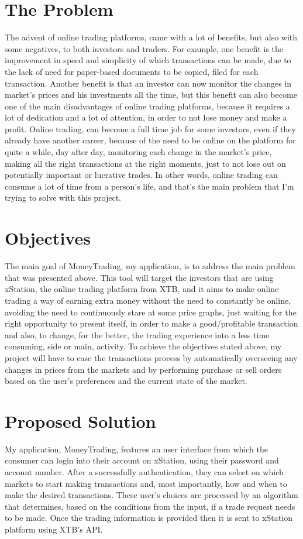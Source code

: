 \documentclass[12pt,a4paper]{report}
\begin{document}
\section{The Problem} 
The advent of online trading platforms, came with a lot of benefits, but also with some negatives, to both investors and traders. For example, one benefit is the improvement in speed and simplicity of which transactions can be made, due to the lack of need for paper-based documents to be copied, filed for each transaction. Another benefit is that an investor can now monitor the changes in market's prices and his investments all the time, but this benefit can also become one of the main disadvantages of online trading platforms, because it requires a lot of dedication and a lot of attention, in order to not lose money and make a profit. Online trading, can become a full time job for some investors, even if they already have another career, because of the need to be online on the platform for quite a while, day after day, monitoring each change in the market's price, making all the right transactions at the right moments, just to not lose out on potentially important or lucrative trades. In other words, online trading can consume a lot of time from a person's life, and that's the main problem that I'm trying to solve with this project.        
\section{Objectives}
The main goal of MoneyTrading, my application, is to address the main problem that was presented above. This tool will target the investors that are using xStation, the online trading platform from XTB, and it aims to make online trading a way of earning extra money without the need to constantly be online, avoiding the need to continuously stare at some price graphs, just waiting for the right opportunity to present itself, in order to make a good/profitable transaction and also, to change, for the better, the trading experience into a less time consuming, side or main, activity. To achieve the objectives stated above, my project will have to ease the transactions process by automatically overseeing any changes in prices from the markets and by performing purchase or sell orders based on the user's preferences and the current state of the market. 
\section{Proposed Solution} 
My application, MoneyTrading, features an user interface from which the consumer can login into their account on xStation, using their password and account number. After a successfully authentication, they can select on which markets to start making transactions and, most importantly, how and when to make the desired transactions. These user's choices are processed by an algorithm that determines, based on the conditions from the input, if a trade request needs to be made. Once the trading information is provided then it is sent to xStation platform using XTB's API.
\end{document}

